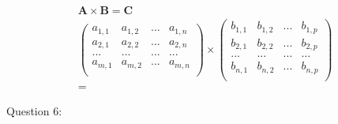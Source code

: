 \documentclass{article}
\begin{document}
\begin{align}
    \mathbf{A} \times \mathbf{B} = \mathbf{C} \\
    \begin{pmatrix}
        a_{1,1} & a_{1,2} & ... & a_{1,n} \\
        a_{2,1} & a_{2,2} & ... & a_{2,n} \\
        ...     & ...     & ... & ...     \\
        a_{m,1} & a_{m,2} & ... & a_{m,n} \\
    \end{pmatrix}
    \times
    \begin{pmatrix}
        b_{1,1} & b_{1,2} & ... & b_{1,p} \\
        b_{2,1} & b_{2,2} & ... & b_{2,p} \\
        ...     & ...     & ... & ...     \\
        b_{n,1} & b_{n,2} & ... & b_{n,p} \\
    \end{pmatrix} \\
    =
\end{align}

Question 6:
\end{document}
